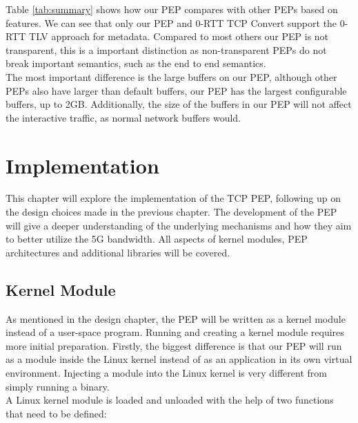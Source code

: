 \documentclass[a4paper,english, 11pt]{report}
\begin{document}
Table \ref{tab:summary} shows how our PEP compares with other PEPs based on features. We can see that only our PEP and 0-RTT TCP Convert support the 0-RTT TLV approach for metadata. Compared to most others our PEP is not transparent, this is a important distinction as non-transparent PEPs do not break important semantics, such as the end to end semantics.\\

The most important difference is the large buffers on our PEP, although other PEPs also have larger than default buffers, our PEP has the largest configurable buffers, up to 2GB. Additionally, the size of the buffers in our PEP will not affect the interactive traffic, as normal network buffers would.




\chapter{Implementation}
This chapter will explore the implementation of the TCP PEP, following up on the design choices made in the previous chapter. The development of the PEP will give a deeper understanding of the underlying mechanisms and how they aim to better utilize the 5G bandwidth. All aspects of kernel modules, PEP architectures and additional libraries will be covered.

\section{Kernel Module}
As mentioned in the design chapter, the PEP will be written as a kernel module instead of a user-space program. Running and creating a kernel module requires more initial preparation. Firstly, the biggest difference is that our PEP will run as a module inside the Linux kernel instead of as an application in its own virtual environment. Injecting a module into the Linux kernel is very different from simply running a binary.\\

A Linux kernel module is loaded and unloaded with the help of two functions that need to be defined:\\
\end{document}
